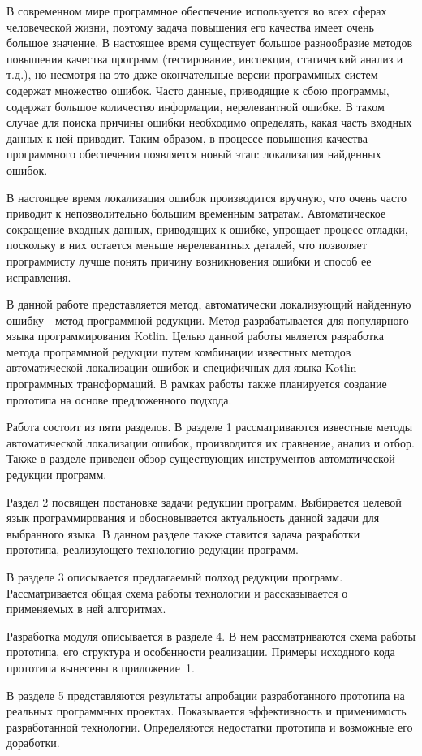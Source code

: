 \intro
В современном мире программное обеспечение используется во всех сферах человеческой жизни, поэтому задача повышения его качества имеет очень большое значение. В настоящее время существует большое разнообразие методов повышения качества программ (тестирование, инспекция, статический анализ и т.д.), но несмотря на это даже окончательные версии программных систем содержат множество ошибок. Часто данные, приводящие к сбою программы, содержат большое количество информации, нерелевантной ошибке. В таком случае для поиска причины ошибки необходимо определять, какая часть входных данных к ней приводит. Таким образом, в процессе повышения качества программного обеспечения появляется новый этап: локализация найденных ошибок. 

В настоящее время локализация ошибок производится вручную, что очень часто приводит к непозволительно большим временным затратам. Автоматическое сокращение входных данных, приводящих к ошибке, упрощает процесс отладки, поскольку в них остается меньше нерелевантных деталей, что позволяет программисту лучше понять причину возникновения ошибки и способ ее исправления.

В данной работе представляется метод, автоматически локализующий найденную ошибку - метод программной редукции. Метод разрабатывается для популярного~\cite{tiobe2018tiobe} языка программирования Kotlin. Целью данной работы является разработка метода программной редукции путем комбинации известных методов автоматической локализации ошибок и специфичных для языка Kotlin программных трансформаций. В рамках работы также планируется создание прототипа на основе предложенного подхода.

Работа состоит из пяти разделов. В разделе 1 рассматриваются известные методы автоматической локализации ошибок, производится их сравнение, анализ и отбор. Также в разделе приведен обзор существующих инструментов автоматической редукции программ.

Раздел 2 посвящен постановке задачи редукции программ. Выбирается целевой язык программирования и обосновывается актуальность данной задачи для выбранного языка. В данном разделе также ставится задача разработки прототипа, реализующего технологию редукции программ.

В разделе 3 описывается предлагаемый подход редукции программ. Рассматривается общая схема работы технологии и рассказывается о применяемых в ней алгоритмах.

Разработка модуля описывается в разделе 4. В нем рассматри­ваются схема работы прототипа, его структура и особенности реализации. Примеры исходного кода прототипа вынесены в приложение~1.

В разделе 5 представляются результаты апробации разработан­ного прототипа на реальных программных проектах. Показывается эффективность и применимость разработанной технологии. Определяются недостатки прототипа и возможные его доработки. 